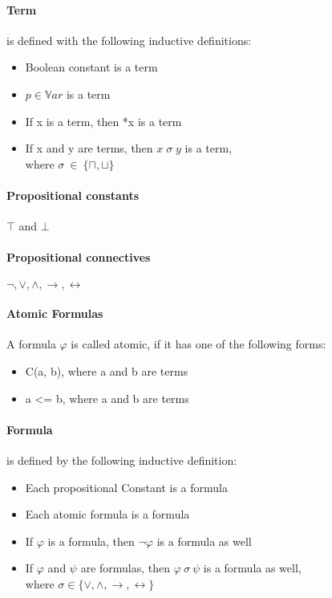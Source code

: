 \documentclass{article}
\begin{document}
	\paragraph{Term} 
is defined with the following inductive definitions:
	\label{sec:term-inductive-definition}
		\begin{itemize}
			\item Boolean constant is a term
			\item $p \in \mathbb{V}ar$ is a term
			\item If x is a term, then *x is a term
			\item If x and y are terms, then $x \; \sigma \; y $ is a term,\\
				where $\sigma \: \in \: \{\sqcap, \sqcup\}$
		\end{itemize}	

	\paragraph{Propositional constants}
$\top$ and $\bot$ 

	\paragraph{Propositional connectives} 
$\neg, \vee, \wedge, \rightarrow, \leftrightarrow$

	\paragraph{Atomic Formulas}
		A formula $\varphi$ is called atomic, if it has one of the following forms:
		\begin{itemize}
			\item C(a, b), where a and b are terms
			\item a <= b, where a and b are terms
		\end{itemize}

	\paragraph{Formula}
is defined by the following inductive definition:
	\label{sec:formula-inductive-definition}
		\begin{itemize}
			\item Each propositional Constant is a formula
			\item Each atomic formula is a formula 
			\item If $\varphi$ is a formula, then $\neg{\varphi}$ is a formula as well
			\item If $\varphi$ and $\psi$ are formulas, then $\varphi \: \sigma \: \psi $ is a formula as well,\\
				where $\sigma \in \{\vee, \wedge, \rightarrow, \leftrightarrow\}$
		\end{itemize}
\end{document}
